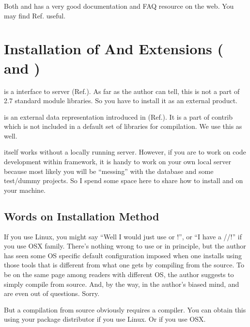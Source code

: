 Both {\psql} and {\python} has a very good documentation and FAQ resource on the web.
You may find Ref.\cite{PythonDoc,PSQLDoc} useful.

\section{Installation of {\psql} And Extensions ({\psycopg} and {\hstore})}

{\psycopg} is a {\python} interface to {\psql} server (Ref.\cite{Psycopg2}). 
As far as the author can tell, this is not a part of {\python} 2.7 standard module 
libraries. So you have to install it as an external product.

{\hstore} is an external data representation introduced in {\psql} (Ref.\cite{HSTORE}).
It is a part of {\psql} {\ttfamily contrib} which is not included in a default set
of libraries for compilation. We use this as well.

{\pubs} itself works without a locally running {\psql} server. 
However, if you are to work on code development within {\pubs} framework, it is handy
to work on your own local {\psql} server because most likely you will be ``messing''
with the database and some test/dummy projects. So I spend some space here to
share how to install {\psql} and {\psycopg} on your machine. 

\subsection{Words on Installation Method}
If you use Linux, you might say ``Well I would just use {\aptget} or {\yum}!'', or 
``I have a {\fink}/{\brew}/{\macport}!'' if you use OSX family.
There's nothing wrong to use {\aptget} or {\yum} in principle, but the author has
seen some OS specific default configuration imposed when one installs using those
tools that is different from what one gets by compiling from the source. 
To be on the same page among readers with different OS, the author suggests to 
simply compile from source. And, by the way, in the author's biased mind, {\fink} 
and {\brew} are even out of questions. Sorry.

But a compilation from source obviously requires a compiler. You can obtain this 
using your package distributor if you use Linux. Or {\xcode} if you use OSX.

